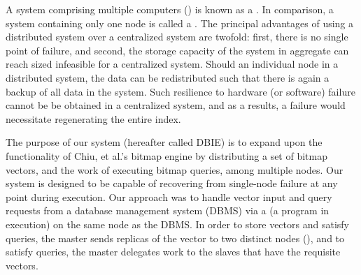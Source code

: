 \par
A system comprising multiple computers () is known as a
. In comparison, a system containing only one node is
called a . The principal advantages of using a
distributed system over a centralized system are twofold: first, there is no
single point of failure, and second, the storage capacity of the system in
aggregate can reach sized infeasible for a centralized system. Should an
individual node in a distributed system, the data can be redistributed such
that there is again a backup of all data in the system. Such resilience to
hardware (or software) failure cannot be be obtained in a centralized system,
and as a results, a failure would necessitate regenerating the entire index.
\par
The purpose of our system (hereafter called DBIE) is to expand upon the
functionality of Chiu, et al.'s bitmap engine by distributing a set of bitmap
vectors, and the work of executing bitmap queries, among multiple nodes. Our
system is designed to be capable of recovering from single-node failure at any
point during execution. Our approach was to handle vector input and query
requests from a database management system (DBMS) via a 
 (a program in execution) on the same node as the
DBMS. In order to store vectors and satisfy queries, the master sends
replicas of the vector to two distinct nodes (), and to satisfy
queries, the master delegates work to the slaves that have the requisite
vectors.
\par
%
%
